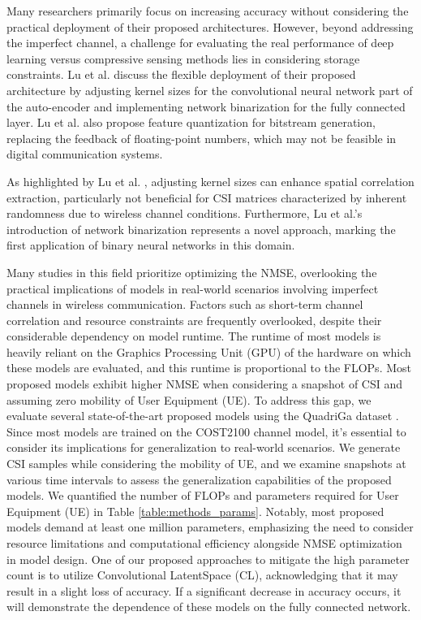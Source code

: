 \documentclass[lettersize,journal]{IEEEtran}
\begin{document}
Many researchers primarily focus on increasing accuracy without considering the practical deployment of their proposed architectures. However, beyond addressing the imperfect channel, a challenge for evaluating the real performance of deep learning versus compressive sensing methods lies in considering storage constraints. Lu et al. \cite{abp} discuss the flexible deployment of their proposed architecture by adjusting kernel sizes for the convolutional neural network part of the auto-encoder and implementing network binarization for the fully connected layer. Lu et al. \cite{abp} also propose feature quantization for bitstream generation, replacing the feedback of floating-point numbers, which may not be feasible in digital communication systems.

As highlighted by Lu et al. \cite{abp}, adjusting kernel sizes can enhance spatial correlation extraction, particularly not beneficial for CSI matrices characterized by inherent randomness due to wireless channel conditions. Furthermore, Lu et al.'s introduction\cite{abp} of network binarization represents a novel approach, marking the first application of binary neural networks \cite{aaa1} in this domain.

Many studies in this field prioritize optimizing the NMSE, overlooking the practical implications of models in real-world scenarios involving imperfect channels in wireless communication. Factors such as short-term channel correlation and resource constraints are frequently overlooked, despite their considerable dependency on model runtime. The runtime of most models is heavily reliant on the Graphics Processing Unit (GPU) of the hardware on which these models are evaluated, and this runtime is proportional to the FLOPs. Most proposed models exhibit higher NMSE when considering a snapshot of CSI and assuming zero mobility of User Equipment (UE). To address this gap, we evaluate several state-of-the-art proposed models using the QuadriGa dataset \cite{abu}. Since most models are trained on the COST2100 \cite{abf} channel model, it's essential to consider its implications for generalization to real-world scenarios. We generate CSI samples while considering the mobility of UE, and we examine snapshots at various time intervals to assess the generalization capabilities of the proposed models. We quantified the number of FLOPs and parameters required for User Equipment (UE) in Table \ref{table:methods_params}. Notably, most proposed models demand at least one million parameters, emphasizing the need to consider resource limitations and computational efficiency alongside NMSE optimization in model design. One of our proposed approaches to mitigate the high parameter count is to utilize Convolutional LatentSpace (CL), acknowledging that it may result in a slight loss of accuracy. If a significant decrease in accuracy occurs, it will demonstrate the dependence of these models on the fully connected network.
\end{document}
